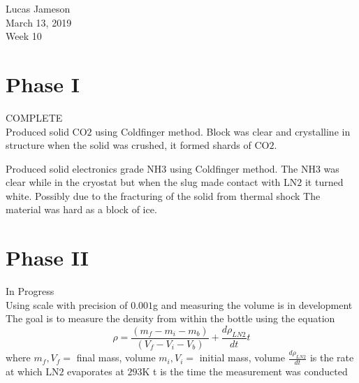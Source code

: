 \documentclass[12pt]{amsart}
\begin{document}
\noindent Lucas Jameson \\
March 13, 2019 \\
Week 10\\

\section{Phase I}
COMPLETE \\
Produced solid CO$2$ using Coldfinger method. Block was clear and crystalline in structure
when the solid was crushed, it formed shards of CO$2$.

Produced solid electronics grade NH$3$ using Coldfinger method.
The NH$3$ was clear while in the cryostat but when the slug made contact with LN$2$
it turned white. Possibly due to the fracturing of the solid from thermal shock
The material was hard as a block of ice.


\section{Phase II}
In Progress \\
Using scale with precision of $0.001$g and measuring the volume is in development
The goal is to measure the density from within the bottle
using the equation
\begin{equation}
\rho =  \frac{(m_{f} - m_{i} - m_{b})}{(V_{f} - V_{i} - V_{b})} + \frac{d \rho_{LN2}}{dt} t
\end{equation}
where $m_{f}, V_{f} = $ final mass, volume
$m_{i}, V_{i} = $  initial mass, volume
$\frac{d \rho_{LN2}}{dt}$ is the rate at which LN$2$ evaporates at $293$K
t is the time the measurement was conducted
\end{document}
